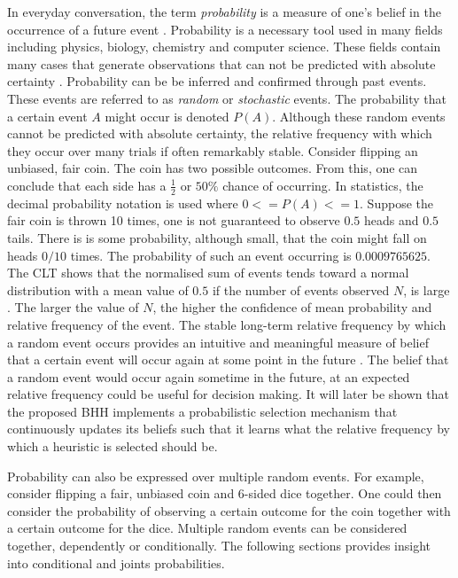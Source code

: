 In everyday conversation, the term \textit{probability} is a measure of one's belief in the occurrence of a future event \cite{ref:wackerly:2014}. Probability is a necessary tool used in many fields including physics, biology, chemistry and computer science. These fields contain many cases that generate observations that can not be predicted with absolute certainty \cite{ref:wackerly:2014}. Probability can be be inferred and confirmed through past events. These events are referred to as \textit{random} or \textit{stochastic} events. The probability that a certain event $A$ might occur is denoted $P(A)$. Although these random events cannot be predicted with absolute certainty, the relative frequency with which they occur over many trials if often remarkably stable. Consider flipping an unbiased, fair coin. The coin has two possible outcomes. From this, one can conclude that each side has a $\frac{1}{2}$ or $50\%$ chance of occurring. In statistics, the decimal probability notation is used where $0 <= P(A) <= 1$. Suppose the fair coin is thrown 10 times, one is not guaranteed to observe $0.5$ heads and $0.5$ tails. There is is some probability, although small, that the coin might fall on heads $0/10$ times. The probability of such an event occurring is $0.0009765625$. The \ac{CLT} shows that the normalised sum of events tends toward a normal distribution with a mean value of $0.5$ if the number of events observed $N$, is large \cite{ref:wackerly:2014}. The larger the value of $N$, the higher the confidence of mean probability and relative frequency of the event. The stable long-term relative frequency by which a random event occurs provides an intuitive and meaningful measure of belief that a certain event will occur again at some point in the future \cite{ref:wackerly:2014}. The belief that a random event would occur again sometime in the future, at an expected relative frequency could be useful for decision making. It will later be shown that the proposed \ac{BHH} implements a probabilistic selection mechanism that continuously updates its beliefs such that it learns what the relative frequency by which a heuristic is selected should be.

Probability can also be expressed over multiple random events. For example, consider flipping a fair, unbiased coin and 6-sided dice together. One could then consider the probability of observing a certain outcome for the coin together with a certain outcome for the dice. Multiple random events can be considered together, dependently or conditionally. The following sections provides insight into conditional and joints probabilities.

